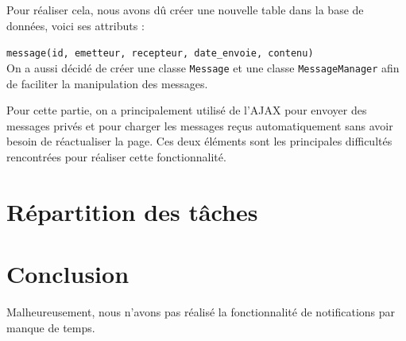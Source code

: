 \documentclass[a4paper, 12pt]{article}
\begin{document}
Pour réaliser cela, nous avons dû créer une nouvelle table dans la base de données, voici ses attributs :

 \texttt{message(id, emetteur, recepteur, date\_envoie, contenu)}\\		
On a aussi décidé de créer une classe \texttt{Message} et une classe \texttt{MessageManager} afin de faciliter la manipulation des messages. 

\vspace{2\baselineskip}

Pour cette partie, on a principalement utilisé de l'AJAX pour envoyer des messages privés et pour charger les messages reçus automatiquement sans avoir besoin de réactualiser la page. Ces deux éléments sont les principales difficultés rencontrées pour réaliser cette fonctionnalité.


\section{Répartition des tâches}
	
			
\section{Conclusion}			
Malheureusement, nous n'avons pas réalisé la fonctionnalité de notifications par manque de temps.
\end{document}
